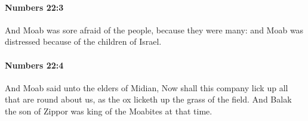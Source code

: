 		\paragraph{Numbers 22:3} %
			\label{NUMBERS-22-3}

			And Moab was sore afraid of the people, because they were many: and Moab was distressed because of the children of Israel.


		\paragraph{Numbers 22:4} %
			\label{NUMBERS-22-4}

			And Moab said unto the elders of Midian, Now shall this company lick up all that are round about us, as the ox licketh up the grass of the field. And Balak the son of Zippor was king of the Moabites at that time.


